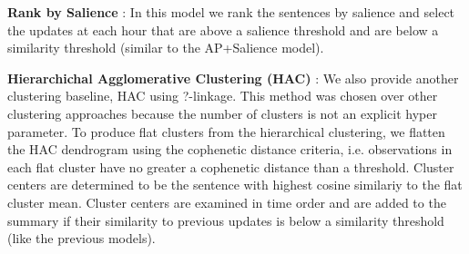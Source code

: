 \textbf{Rank by Salience} : In this model we rank the sentences by salience and select the updates at each hour that are
above a salience threshold and are below a similarity threshold (similar to the AP+Salience model). 

\textbf{Hierarchichal Agglomerative Clustering (HAC)} : We also provide another clustering baseline, HAC using ?-linkage. 
This method was chosen over other clustering approaches because the number of clusters 
is not an explicit hyper parameter. To produce flat clusters from the hierarchical clustering, we flatten the HAC dendrogram
using the cophenetic distance criteria, i.e. observations in each flat cluster have no greater a cophenetic distance than a threshold.
Cluster centers are determined to be the sentence with highest cosine similariy to the flat cluster mean.
Cluster centers are examined in time order and are added to the summary if their similarity to previous updates is below a similarity threshold
(like the previous models).


